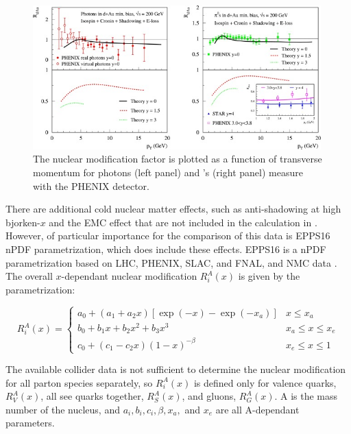   \begin{figure}[htpb]
    \centering
    \includegraphics[width=0.99\textwidth]{CNM_cal.jpg}
    \caption{The nuclear modification factor is plotted as a function of transverse momentum for photons (left panel) and \pizero's (right panel) measure with the PHENIX detector.}
    \label{fig:CNM_calc}
  \end{figure}

There are additional cold nuclear matter effects, such as anti-shadowing at high bjorken-$x$ and the EMC effect that are not included in the calculation in \cite{Kang2012}.
  However, of particular importance for the comparison of this data is EPPS16 nPDF parametrization, which does include these effects. EPPS16 is a nPDF parametrization based on LHC, PHENIX, SLAC, and FNAL, and NMC data \cite{epps16:2017}. The overall $x$-dependant nuclear modification $R_{i}^{A}(x)$ is given by the parametrization:

  \begin{equation}
    R_{i}^{A}(x)=\left\{\begin{array}{ll}
        a_{0}+\left(a_{1}+a_{2} x\right)\left[\exp (-x)-\exp \left(-x_{a}\right)\right] & x \leq x_{a} \\
        b_{0}+b_{1} x+b_{2} x^{2}+b_{3} x^{3} & x_{a} \leq x \leq x_{e} \\
        c_{0}+\left(c_{1}-c_{2} x\right)(1-x)^{-\beta} & x_{e} \leq x \leq 1
    \end{array}\right.
  \end{equation}

The available collider data is not sufficient to determine the nuclear modification for all parton species separately, so $R_{i}^{A}(x)$ is defined only for valence quarks,  $R_{V}^{A}(x)$, all see quarks together,  $R_{S}^{A}(x)$, and gluons,  $R_{G}^{A}(x)$. A is the mass number of the nucleus, and  $a_i, b_i, c_i, \beta, x_a,$ and $x_e$ are all A-dependant parameters. 

